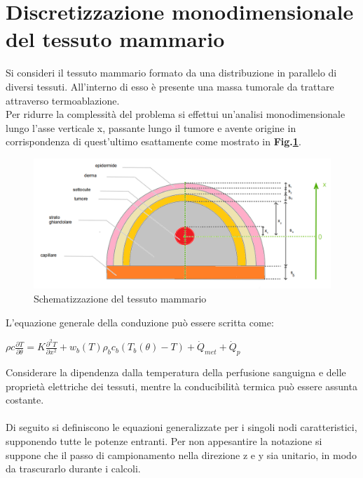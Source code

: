 \section*{Discretizzazione monodimensionale\\ del tessuto mammario}
Si consideri il tessuto mammario formato da una distribuzione in parallelo di diversi tessuti. All'interno di esso è presente una massa tumorale da trattare attraverso termoablazione.\\Per ridurre la complessità del problema si effettui un'analisi monodimensionale lungo l'asse verticale x, passante lungo il tumore e avente origine in corrispondenza di quest'ultimo esattamente come mostrato in \textbf{Fig.\ref{sistema}}.

\begin{figure}[H]
    \centering
    \includegraphics[width=1\textwidth]{Immagini/sistema_1.png} 
    \caption{Schematizzazione del tessuto mammario}
    \label{sistema}
\end{figure}

\vspace{0.1cm}
\noindent
L’equazione generale della conduzione può essere scritta come:
\begin{center}
	$\rho c \frac{\partial{T}}{\partial{\theta}}= K  \frac{\partial^2{T}}{\partial{x^2}}+ w_b (T) \rho _b c_b (T_b(\theta)-T) + \Dot{Q} _{met} +\Dot{Q} _{p}$
\end{center}
Considerare la dipendenza dalla temperatura della perfusione sanguigna e delle proprietà elettriche dei tessuti, mentre la conducibilità termica può essere assunta costante.\\\\Di seguito si definiscono le equazioni generalizzate per i singoli nodi caratteristici, supponendo tutte le potenze entranti. Per non appesantire la notazione si suppone che il passo di campionamento nella direzione z e y sia unitario, in modo da trascurarlo durante i calcoli.

